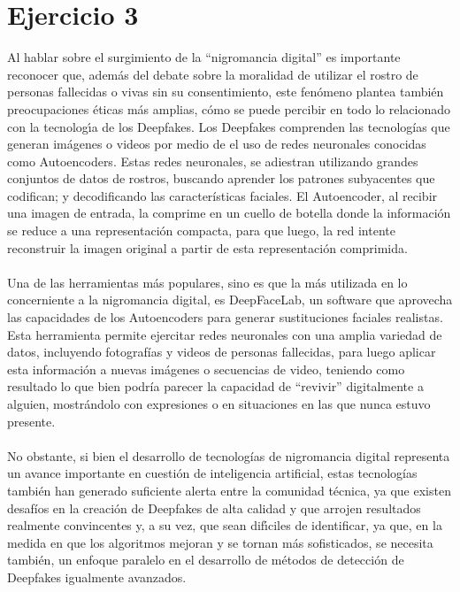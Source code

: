 \section*{Ejercicio 3}
\noindent Al hablar sobre el surgimiento de la “nigromancia digital” es importante reconocer que, además del debate sobre la moralidad de utilizar el rostro de personas fallecidas o vivas sin su consentimiento, este fenómeno plantea también preocupaciones éticas más amplias, cómo se puede percibir en todo lo relacionado con la tecnologı́a de los
Deepfakes. Los Deepfakes comprenden las tecnologías que generan imágenes o videos por medio de el uso de redes neuronales conocidas como Autoencoders. Estas redes neuronales, se adiestran utilizando grandes conjuntos de datos de rostros, buscando aprender los patrones subyacentes que codifican; y decodificando las características faciales. El Autoencoder, al recibir una imagen de entrada, la comprime en un cuello de botella donde la información se reduce a una representación compacta, para que luego, la red intente reconstruir la imagen original a partir de esta representación comprimida.\\\\
Una de las herramientas más populares, sino es que la más utilizada en lo concerniente a la nigromancia digital, es DeepFaceLab, un software que aprovecha las capacidades de los Autoencoders para generar sustituciones faciales realistas. Esta herramienta permite ejercitar redes neuronales con una amplia variedad de datos, incluyendo fotografías y videos de personas fallecidas, para luego aplicar esta información a nuevas imágenes o secuencias de video, teniendo como resultado lo que bien podría parecer la capacidad de “revivir” digitalmente a alguien, mostrándolo con expresiones o en situaciones en las que nunca estuvo presente.\\\\
No obstante, si bien el desarrollo de tecnologías de nigromancia digital representa un avance importante en cuestión de inteligencia artificial, estas tecnologías también han generado suficiente alerta entre la comunidad técnica, ya que existen desafíos en la creación de Deepfakes de alta calidad y que arrojen resultados realmente convincentes y, a su vez, que sean difı́ciles de identificar, ya que, en la medida en que los algoritmos mejoran y se tornan más sofisticados, se necesita también, un enfoque paralelo en el desarrollo de métodos de detección de Deepfakes igualmente avanzados.\\\\
